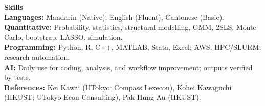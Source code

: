 \documentclass[11pt,letterpaper]{article}
\begin{document}
\vspace{0.15pt}

{\large \textbf{Skills}}\\[-0.5pt]
\textbf{Languages:} Mandarin (Native), English (Fluent), Cantonese (Basic).\\
\textbf{Quantitative:} Probability, statistics, structural modelling, GMM, 2SLS, Monte Carlo, bootstrap, LASSO, simulation.\\
\textbf{Programming:} Python, R, C++, MATLAB, Stata, Excel; AWS, HPC/SLURM; research automation.\\
\textbf{AI:} Daily use for coding, analysis, and workflow improvement; outputs verified by tests.\\
\textbf{References:} Kei Kawai (UTokyo; Compass Lexecon), Kohei Kawaguchi (HKUST; UTokyo Econ Consulting), Pak Hung Au (HKUST).
\end{document}

